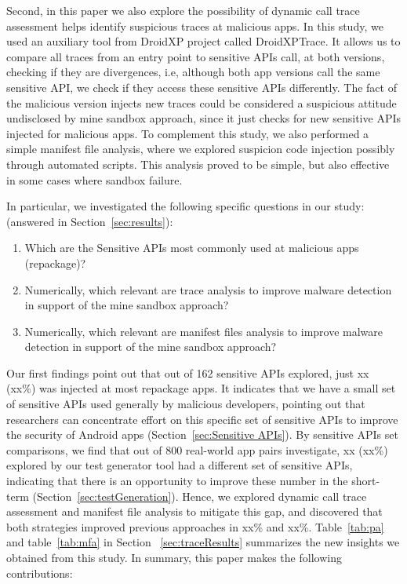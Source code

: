 Second, in this paper we also explore the possibility of dynamic call trace assessment helps identify suspicious traces at malicious apps. In this study, we used an auxiliary tool from DroidXP project called DroidXPTrace. It allows us to compare all traces from an entry point to sensitive APIs call, at both versions, checking if they are divergences, i.e, although both app versions call the same sensitive API, we check if they access these sensitive APIs differently. The fact of the malicious version injects new traces could be considered a suspicious attitude undisclosed by mine sandbox approach, since it just checks for new sensitive APIs injected for malicious apps. To complement this study, we also performed a simple manifest file analysis, where we explored suspicion code injection possibly through automated scripts. This analysis proved to be simple, but also effective in some cases where sandbox failure.

In particular, we investigated the following specific questions in our study: (answered in Section~\ref{sec:results}):

\begin{enumerate}[(RQ1)]
 \item Which are the Sensitive APIs most commonly used at malicious apps (repackage)?
 \item Numerically, which relevant are trace analysis to improve malware detection in support of the mine sandbox approach?
 \item Numerically, which relevant are manifest files analysis to improve malware detection in support of the mine sandbox approach?\newline
\end{enumerate}
 
Our first findings point out that out of 162 sensitive APIs explored, just xx (xx\%) was injected at most repackage apps. It indicates that we have a small set of sensitive APIs used generally by malicious developers, pointing out that researchers can concentrate effort on this specific set of sensitive APIs to improve the security of Android apps (Section~\ref{sec:Sensitive APIs}). By sensitive APIs set comparisons, we find that out of 800 real-world app pairs investigate, xx (xx\%) explored by our test generator tool had a different set of sensitive APIs, indicating that there is an opportunity to improve these number in the short-term (Section~\ref{sec:testGeneration}). Hence, we explored dynamic call trace assessment and manifest file analysis to mitigate this gap, and discovered that both strategies improved previous approaches in xx\% and xx\%. Table~\ref{tab:pa} and table~\ref{tab:mfa} in Section ~\ref{sec:traceResults} summarizes the new insights we obtained from this study.\newline
\newline
In summary, this paper makes the following contributions:

